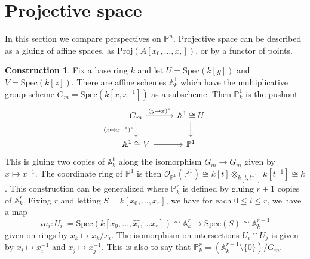 \documentclass[letterpaper,10pt,twoside]{amsart}
\theoremstyle{proposition}
\theoremstyle{definition}
\theoremstyle{theorem}
\theoremstyle{definition}
\theoremstyle{definition}
\theoremstyle{definition}
\theoremstyle{lemma}
\theoremstyle{definition}
\theoremstyle{definition}
\newtheorem{construct}[proposition]{Construction}
\theoremstyle{corollary}
\theoremstyle{definition}
\def\Spec{\text{Spec}}
\def\O{\mathcal{O}}
\def\Proj{\text{Proj}}
\def\P{\mathbb{P}}
\def\A{\mathbb{A}}
\begin{document}
\section{Projective space}

In this section we compare perspectives on $\mathbb{P}^n$. Projective space can be described as a gluing of affine spaces, as $\Proj(A[x_0,\dots,x_r])$, or by a functor of points.

\begin{construct}
    Fix a base ring $k$ and let $U=\Spec(k[y])$ and $V=\Spec(k[z])$. There are affine schemes $\A^1_k$ which have the multiplicative group scheme $G_m=\Spec(k[x,x^{-1}])$ as a subscheme. Then $\P^1_k$ is the pushout \[\begin{tikzcd}
	{G_m} & {\A^1\cong U} \\
	{\A^1\cong V} & {\P^1}
	\arrow["{(y\mapsto x)^*}", from=1-1, to=1-2]
	\arrow["{(z\mapsto x^{-1})^*}"', from=1-1, to=2-1]
	\arrow[from=1-2, to=2-2]
	\arrow[from=2-1, to=2-2]
\end{tikzcd}\] This is gluing two copies of $\A^1_k$ along the isomorphism $G_m\to G_m$ given by $x\mapsto x^{-1}$. The coordinate ring of $\P^1$ is then $\O_{\P^1}(\P^1) \cong k[t]\otimes_{k[t,t^{-1}]}k[t^{-1}]\cong k$. This construction can be generalized where $\P^r_k$ is defined by gluing $r+1$ copies of $\A^r_k$. Fixing $r$ and letting $S=k[x_0,\dots,x_r]$, we have for each $0\leq i\leq r$, we have a map \[in_i:U_i:=\Spec(k[x_0,\dots,\hat{x_i},\dots x_r])\cong \A^r_k \to \Spec(S)\cong \A^{r+1}_k\] given on rings by $x_k\mapsto x_k/x_i$. The isomorphism on intersections $U_i\cap U_j$ is given by $x_i\mapsto x_i^{-1}$ and $x_j\mapsto x_j^{-1}$. This is also to say that $\P^r_k = (\A^{r+1}_k\setminus\{0\})/G_m$.
\end{construct}
\end{document}
